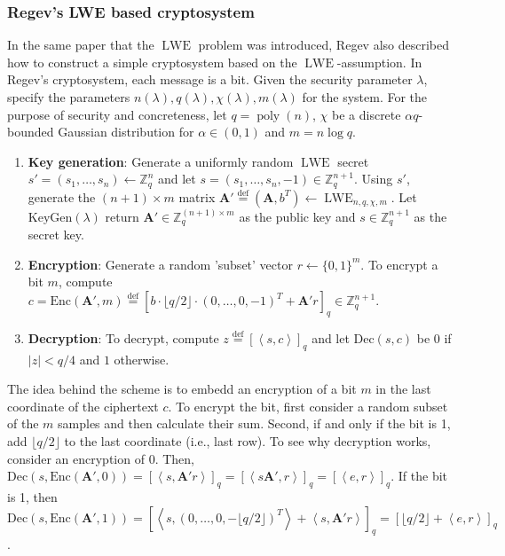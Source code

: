\subsubsection*{Regev's LWE based cryptosystem}
In the same paper that the $\operatorname{LWE}$ problem was introduced, Regev also described how to construct a simple cryptosystem based on the $\operatorname{LWE}$-assumption. In Regev's cryptosystem, each message is a bit. Given the security parameter $\lambda$, specify the parameters $n(\lambda), q(\lambda), \chi(\lambda), m(\lambda)$ for the system. For the purpose of security and concreteness, let $q = \operatorname{poly}(n)$, $\chi$ be a discrete $\alpha q$-bounded Gaussian distribution for $\alpha \in (0,1)$ and $m = n \log q$.
\begin{enumerate}
    \item \textbf{Key generation}: Generate a uniformly random $\operatorname{LWE}$ secret $s' = (s_1, \dots, s_n) \leftarrow \mathbb{Z}_q^n$ and let $s = (s_1, \dots, s_n, -1) \in \mathbb{Z}_q^{n+1}$. Using $s'$, generate the $(n+1) \times m$ matrix $\textbf{A}' \stackrel{\mathrm{def}}{=} (\textbf{A}, b^T) \leftarrow \operatorname{LWE}_{n,q,\chi,m}$. Let $\text{KeyGen}(\lambda)$ return $\textbf{A}' \in \mathbb{Z}_q^{(n+1)\times m}$ as the public key and $s \in \mathbb{Z}_q^{n+1}$ as the secret key.
    \item \textbf{Encryption}: Generate a random 'subset' vector $r \leftarrow \{0,1\}^m$. To encrypt a bit $m$, compute $c = \text{Enc}(\textbf{A}',m) \stackrel{\mathrm{def}}{=} [b \cdot \lfloor q/2 \rfloor \cdot (0, \dots, 0, -1)^T + \textbf{A}'r]_q \in \mathbb{Z}_q^{n+1}$.
    \item \textbf{Decryption}: To decrypt, compute $z \stackrel{\mathrm{def}}{=} [\left \langle s, c \right \rangle]_q$ and let $\text{Dec}(s,c)$ be $0$ if $|z| < q/4$ and $1$ otherwise.
\end{enumerate}

The idea behind the scheme is to embedd an encryption of a bit $m$ in the last coordinate of the ciphertext $c$. To encrypt the bit, first consider a random subset of the $m$ samples and then calculate their sum. Second, if and only if the bit is 1, add $\lfloor q/2 \rfloor$ to the last coordinate (i.e., last row). To see why decryption works, consider an encryption of $0$. Then, $\text{Dec}(s,\text{Enc}(\textbf{A}',0))= [\left \langle s, \textbf{A}'r \right \rangle]_q = [\left \langle s \textbf{A}', r \right \rangle]_q = [\left \langle e, r \right \rangle]_q$. If the bit is 1, then $\text{Dec}(s,\text{Enc}(\textbf{A}',1)) = [\left \langle s, (0, \dots, 0, -\lfloor q/2 \rfloor)^T \right \rangle + \left \langle s, \textbf{A}'r \right \rangle ]_q = [\lfloor q/2 \rfloor + \left \langle e, r \right \rangle]_q$.



